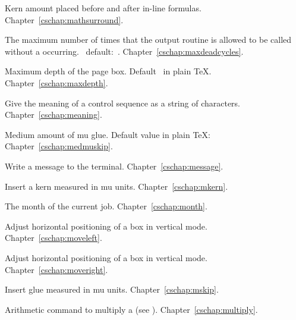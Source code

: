\begin{glossinventory}
\item [\cs{mathsurround}]
      Kern amount placed before and after in-line formulas.
Chapter~\ref{cschap:mathsurround}.

\item [\cs{maxdeadcycles}]
      The maximum number of times that the output routine is allowed to
      be called without a  occurring.
      \IniTeX\ default:~.
Chapter~\ref{cschap:maxdeadcycles}.

\item [\cs{maxdepth}]
      Maximum depth of the page box.
      Default~\n{4pt} in plain \TeX.
Chapter~\ref{cschap:maxdepth}.

\item [\cs{meaning}]
      Give the meaning of a control sequence as a string of characters.
Chapter~\ref{cschap:meaning}.

\item [\cs{medmuskip}]
      Medium amount of mu glue.
      Default value in plain \TeX: 
Chapter~\ref{cschap:medmuskip}.

\item [\cs{message\gr{general text}}]
      Write a message to the terminal.
     Chapter~\ref{cschap:message}.
 
\item [\cs{mkern}]
      Insert a kern measured in mu units.
Chapter~\ref{cschap:mkern}.

\item [\cs{month}]
      The month of the current job.
Chapter~\ref{cschap:month}.

\item [\cs{moveleft\gr{dimen}\gr{box}}]
      Adjust horizontal positioning of a box in vertical mode. 
Chapter~\ref{cschap:moveleft}.

\item [\cs{moveright\gr{dimen}\gr{box}}]
      Adjust horizontal positioning of a box in vertical mode. 
Chapter~\ref{cschap:moveright}.

\item [\cs{mskip}]
      Insert glue measured in mu units.
Chapter~\ref{cschap:mskip}.

\item [\cs{multiply\gr{numeric variable}\gr{optional \n{by}}\gr{number}}]
      Arithmetic command to multiply a
       (see ).
Chapter~\ref{cschap:multiply}.


\end{glossinventory}
